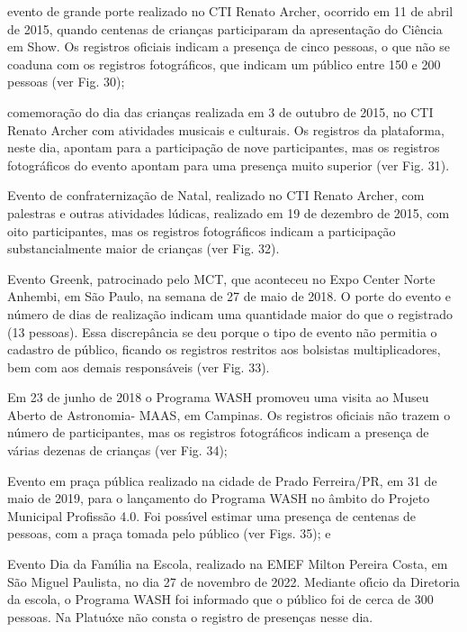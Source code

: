 \documentclass[
12pt,		%
openright,	%
twoside,  %
a4paper,			%
chapter=TITLE,		%
english,			%
french,				%
spanish,			%
brazil				%
]{USPSC-classe/USPSC}
\begin{document}
\begin{alineas}
\item evento de grande porte realizado no CTI Renato Archer, ocorrido em 11 de abril de 2015, quando centenas de crian\c{c}as participaram da apresenta\c{c}\~ao do \textquotedbl Ci\^encia em Show\textquotedbl . Os registros oficiais indicam a presen\c{c}a de cinco pessoas, o que n\~ao se coaduna com os registros fotogr\'aficos, que indicam um p\'ublico entre 150 e 200 pessoas (ver Fig. 30);
\item comemora\c{c}\~ao do dia das crian\c{c}as realizada em 3 de outubro de 2015, no CTI Renato Archer com atividades musicais e culturais. Os registros da plataforma, neste dia, apontam para a participa\c{c}\~ao de nove participantes, mas os registros fotogr\'aficos do evento apontam para uma presen\c{c}a muito superior (ver Fig. 31).
\item Evento de confraterniza\c{c}\~ao de Natal, realizado no CTI Renato Archer, com palestras e outras atividades l\'udicas, realizado em 19 de dezembro de 2015, com oito participantes, mas os registros fotogr\'aficos indicam a participa\c{c}\~ao substancialmente maior de crian\c{c}as (ver Fig. 32).
\item Evento Greenk, patrocinado pelo MCT, que aconteceu no Expo Center Norte Anhembi, em S\~ao Paulo, na semana de 27 de maio de 2018. O porte do evento e n\'umero de dias de realiza\c{c}\~ao indicam uma quantidade  maior do que o registrado (13 pessoas). Essa discrep\^ancia se deu porque o tipo de evento n\~ao permitia o cadastro de p\'ublico, ficando os registros restritos aos bolsistas multiplicadores, bem com aos demais respons\'aveis (ver Fig. 33).
\item Em 23 de junho de 2018 o Programa WASH promoveu uma visita ao Museu Aberto de Astronomia- MAAS, em Campinas. Os registros oficiais n\~ao trazem o n\'umero de participantes, mas os registros fotogr\'aficos indicam a presen\c{c}a de v\'arias dezenas de crian\c{c}as (ver Fig. 34);
\item Evento em pra\c{c}a p\'ublica realizado na cidade de Prado Ferreira/PR, em 31 de maio de 2019, para o lan\c{c}amento do Programa WASH no \^ambito do Projeto Municipal Profiss\~ao 4.0. Foi poss\'{\i}vel estimar uma presen\c{c}a de centenas de pessoas, com a pra\c{c}a tomada pelo p\'ublico (ver Figs. 35); e
\item Evento Dia da Fam\'{\i}lia na Escola, realizado na EMEF Milton Pereira Costa, em S\~ao Miguel Paulista, no dia 27 de novembro de 2022. Mediante of\'{\i}cio da Diretoria da escola, o Programa WASH foi informado que o p\'ublico foi de cerca de 300 pessoas. Na Platu\'oxe n\~ao consta o registro de presen\c{c}as nesse dia.
\end{alineas}
\end{document}
